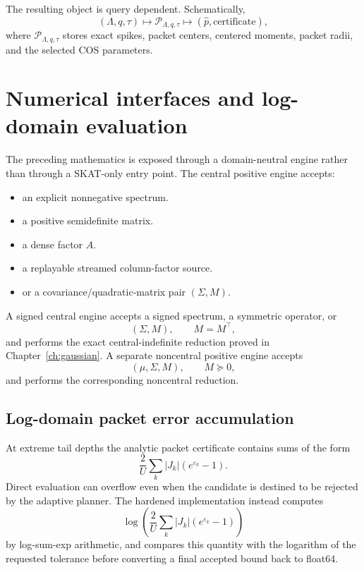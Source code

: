 The resulting object is query dependent. Schematically,
\begin{equation}
(\Lambda,q,\tau)
\longmapsto
\mathcal P_{\Lambda,q,\tau}
\longmapsto
(\widehat p,\text{certificate}),
\label{eq:compiler-map}
\end{equation}
where $\mathcal P_{\Lambda,q,\tau}$ stores exact spikes, packet centers, centered moments, packet radii, and the selected COS parameters.


\section{Numerical interfaces and log-domain evaluation}\label{sec:final-25}

The preceding mathematics is exposed through a domain-neutral engine rather
than through a SKAT-only entry point.  The central positive engine accepts:

\begin{itemize}
\item an explicit nonnegative spectrum.
\item a positive semidefinite matrix.
\item a dense factor \(A\).
\item a replayable streamed column-factor source.
\item or a covariance/quadratic-matrix pair
\((\Sigma,M)\).
\end{itemize}

A signed central engine accepts a signed spectrum, a symmetric operator, or
\[
(\Sigma,M),\qquad M=M^\top,
\]
and performs the exact central-indefinite reduction proved in Chapter~\ref{ch:gaussian}.  A
separate noncentral positive engine accepts
\[
(\mu,\Sigma,M),\qquad M\succeq0,
\]
and performs the corresponding noncentral reduction.

\subsection{Log-domain packet error accumulation}

At extreme tail depths the analytic packet certificate contains sums of the
form
\[
\frac{2}{U}
\sum_k
|J_k|
\left(
e^{\varepsilon_k}-1
\right).
\]
Direct evaluation can overflow even when the candidate is destined to be
rejected by the adaptive planner.  The hardened implementation instead
computes
\[
\log\left(
\frac{2}{U}
\sum_k
|J_k|
\left(
e^{\varepsilon_k}-1
\right)
\right)
\]
by log-sum-exp arithmetic, and compares this quantity with the logarithm of
the requested tolerance before converting a final accepted bound back to
float64.

